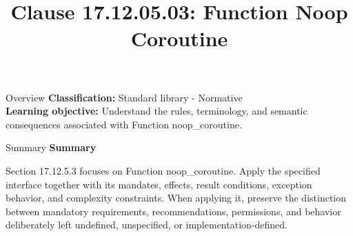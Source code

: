 \documentclass[10pt,letterpaper]{article}
\title{Clause 17.12.05.03: Function Noop Coroutine}
\author{}
\date{}
\begin{document}
\maketitle
\begin{CornellOverviewBox}{Overview}
\textbf{Classification:} Standard library - Normative\\[2pt]
\textbf{Learning objective:} Understand the rules, terminology, and semantic consequences associated with Function noop\_coroutine.
\end{CornellOverviewBox}\begin{CornellSummaryBox}{Summary}
{\sffamily\bfseries\color{Accent} Summary}\par\vspace{3pt}Section 17.12.5.3 focuses on Function noop\_coroutine. Apply the specified interface together with its mandates, effects, result conditions, exception behavior, and complexity constraints. When applying it, preserve the distinction between mandatory requirements, recommendations, permissions, and behavior deliberately left undefined, unspecified, or implementation-defined.
\end{CornellSummaryBox}
\end{document}
